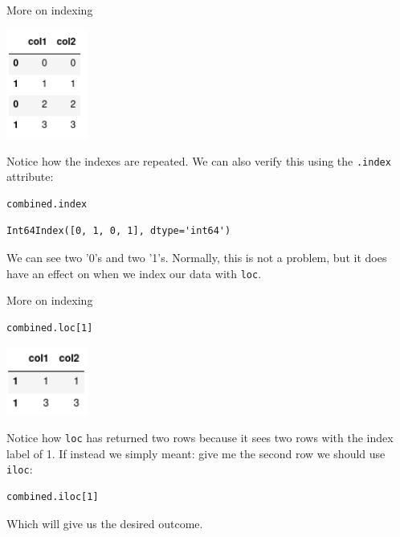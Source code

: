 \documentclass[10pt]{beamer}
\begin{document}
\begin{frame}[label={sec:org4748934},fragile]{More on indexing}
 \begin{center}
\includegraphics[width=0.2\textwidth]{images/combined.png}
\end{center}

Notice how the indexes are repeated. We can also verify this using the \texttt{.index}
attribute:

\begin{verbatim}
combined.index
\end{verbatim}

\begin{verbatim}
Int64Index([0, 1, 0, 1], dtype='int64')
\end{verbatim}

We can see two '0's and two '1's. Normally, this is not a problem, but it does
have an effect on when we index our data with \texttt{loc}.
\end{frame}

\begin{frame}[label={sec:org1887ef4},fragile]{More on indexing}
 \begin{verbatim}
combined.loc[1]
\end{verbatim}

\begin{center}
\includegraphics[width=0.2\textwidth]{images/indexing.png}
\end{center}

Notice how \texttt{loc} has returned two rows because it sees two rows with the index
label of 1. If instead we simply meant: give me the second row we should use
\texttt{iloc}:

\begin{verbatim}
combined.iloc[1]
\end{verbatim}

Which will give us the desired outcome.
\end{frame}
\end{document}
